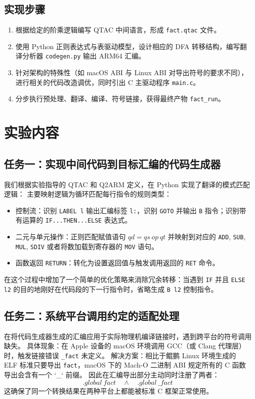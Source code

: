 \documentclass[12pt,a4paper]{ctexart}
\begin{document}
\subsection{实现步骤}
\begin{enumerate}
  \item 根据给定的阶乘逻辑编写 QTAC 中间语言，形成 \texttt{fact.qtac} 文件。
  \item 使用 Python 正则表达式与表驱动模型，设计相应的 DFA 转移结构，编写翻译分析器 \texttt{codegen.py} 输出 ARM64 汇编。
  \item 针对架构的特殊性（如 macOS ABI 与 Linux ABI 对导出符号的要求不同），进行相关的代码改造调优，同时引出 C 主驱动程序 \texttt{main.c}。
  \item 分步执行预处理、翻译、编译、符号链接，获得最终产物 \texttt{fact\_run}。
\end{enumerate}

\section{实验内容}
\subsection{任务一：实现中间代码到目标汇编的代码生成器}
我们根据实验指导的 QTAC 和 Q2ARM 定义，在 Python 实现了翻译的模式匹配逻辑：
主要映射逻辑为循环匹配每行指令的规则类型：
\begin{itemize}
  \item 控制流：识别 \texttt{LABEL l} 输出汇编标签 \texttt{l:}，识别 \texttt{GOTO} 并输出 \texttt{B} 指令；识别带有运算的 \texttt{IF...THEN...ELSE} 表达式。
  \item 二元与单元操作：正则匹配赋值语句 $qd = qs \ op\ qt$ 并映射到对应的 \texttt{ADD}, \texttt{SUB}, \texttt{MUL}, \texttt{SDIV} 或者将数加载到寄存器的 \texttt{MOV} 语句。
  \item 函数返回 \texttt{RETURN}：转化为设置返回值与触发调用返回的 \texttt{RET} 命令。
\end{itemize}

在这个过程中增加了一个简单的优化策略来消除冗余转移：当遇到 \texttt{IF} 并且 \texttt{ELSE l2} 的目的地刚好在代码段的下一行指令时，省略生成 \texttt{B l2} 控制指令。

\subsection{任务二：系统平台调用约定的适配处理}
在将代码生成器生成的汇编应用于实际物理机编译链接时，遇到跨平台的符号调用缺失。
具体现象：在 Apple 设备的 macOS 环境调用 GCC（或 Clang 代理层）时，触发链接错误 \texttt{\_fact} 未定义。
解决方案：相比于鲲鹏 Linux 环境生成的 ELF 标准只要导出 \texttt{fact}，macOS 下的 Mach-O 二进制 ABI 规定所有的 C 函数导出会含有一个 `\_` 前缀。
因此在汇编导出部分主动同时注册了两者：
\begin{equation}
\label{eq:export}
.global\ fact \quad \land \quad .global\ \_fact
\end{equation}
这确保了同一个转换结果在两种平台上都能被标准 C 框架正常使用。
\end{document}
